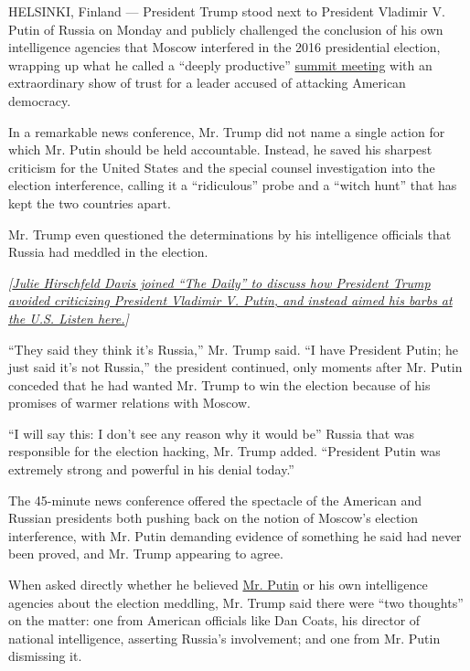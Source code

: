 HELSINKI, Finland --- President Trump stood next to President Vladimir
V. Putin of Russia on Monday and publicly challenged the conclusion of
his own intelligence agencies that Moscow interfered in the 2016
presidential election, wrapping up what he called a ``deeply
productive''
\href{https://www.nytimes.com/2018/07/16/world/europe/trump-putin-summit-helsinki.html?rref=collection\%2Fsectioncollection\%2Fworld\&action=click\&contentCollection=world\&region=rank\&module=package\&version=highlights\&contentPlacement=1\&pgtype=sectionfront}{summit
meeting} with an extraordinary show of trust for a leader accused of
attacking American democracy.

In a remarkable news conference, Mr. Trump did not name a single action
for which Mr. Putin should be held accountable. Instead, he saved his
sharpest criticism for the United States and the special counsel
investigation into the election interference, calling it a
``ridiculous'' probe and a ``witch hunt'' that has kept the two
countries apart.

Mr. Trump even questioned the determinations by his intelligence
officials that Russia had meddled in the election.

\emph{{[}}\href{https://www.nytimes.com/2018/07/17/podcasts/the-daily/trump-putin-russia-summit-meeting.html?rref=nytimes.com\%2Fthedaily}{\emph{Julie
Hirschfeld Davis joined ``The Daily'' to discuss how President Trump
avoided criticizing President Vladimir V. Putin, and instead aimed his
barbs at the U.S. Listen here.}}\emph{{]}}

``They said they think it's Russia,'' Mr. Trump said. ``I have President
Putin; he just said it's not Russia,'' the president continued, only
moments after Mr. Putin conceded that he had wanted Mr. Trump to win the
election because of his promises of warmer relations with Moscow.

``I will say this: I don't see any reason why it would be'' Russia that
was responsible for the election hacking, Mr. Trump added. ``President
Putin was extremely strong and powerful in his denial today.''

The 45-minute news conference offered the spectacle of the American and
Russian presidents both pushing back on the notion of Moscow's election
interference, with Mr. Putin demanding evidence of something he said had
never been proved, and Mr. Trump appearing to agree.

When asked directly whether he believed
\href{100000006003853/web/editing}{Mr. Putin} or his own intelligence
agencies about the election meddling, Mr. Trump said there were ``two
thoughts'' on the matter: one from American officials like Dan Coats,
his director of national intelligence, asserting Russia's involvement;
and one from Mr. Putin dismissing it.

